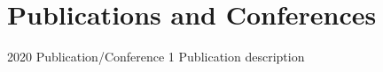 \documentclass[american]{cv-class}
\begin{document}
\section{Publications and Conferences}
\begin{entrylist}
	\entry
	{2020}
	{Publication/Conference 1}
	{ }
	{\justifying Publication description \\
	{\href{https://yourCertificate.com}{}}
}
\end{entrylist}
\end{document}
